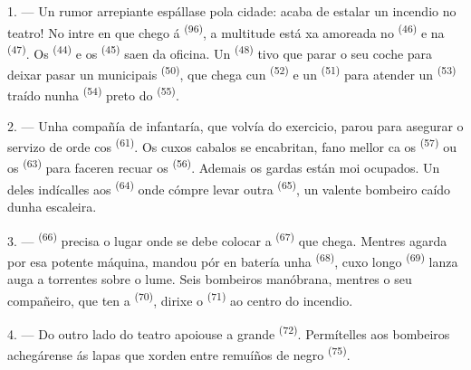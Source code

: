 \VUsaut{5.0mm}
\VUsaut{3.0mm}

\VUsaut{3.4mm}

1. --- Un rumor arrepiante espállase pola cidade: acaba de estalar un incendio no
teatro! No intre en que chego á  \textsuperscript{(96)}, a multitude
está xa amoreada no  \textsuperscript{(46)} e na 
\textsuperscript{(47)}. Os  \textsuperscript{(44)} e os
 \textsuperscript{(45)} saen da oficina. Un  \textsuperscript{(48)} tivo que parar o seu coche para deixar pasar un
 municipais \textsuperscript{(50)}, que chega cun
 \textsuperscript{(52)} e un 
\textsuperscript{(51)} para atender un  \textsuperscript{(53)} traído
nunha  \textsuperscript{(54)} preto do 
\textsuperscript{(55)}.

2. --- Unha compañía de infantaría, que volvía do exercicio, parou para asegurar o
servizo de orde cos  \textsuperscript{(61)}. Os
 cuxos cabalos se encabritan, fano mellor ca os 
\textsuperscript{(57)} ou os  \textsuperscript{(63)} para faceren
recuar os  \textsuperscript{(56)}. Ademais os gardas están moi ocupados. Un
deles
indícalles aos  \textsuperscript{(64)} onde cómpre levar
outra  \textsuperscript{(65)}, un valente bombeiro caído dunha
escaleira.

3. ---  \textsuperscript{(66)} precisa o lugar onde se debe colocar
a  \textsuperscript{(67)} que chega. Mentres agarda por esa
potente máquina, mandou pór en batería unha 
\textsuperscript{(68)}, cuxo longo  \textsuperscript{(69)} lanza auga a
torrentes sobre o lume. Seis bombeiros manóbrana, mentres o seu compañeiro, que ten a
 \textsuperscript{(70)}, dirixe o 
\textsuperscript{(71)} ao centro do incendio.

4. --- Do outro lado do teatro apoiouse a grande 
\textsuperscript{(72)}. Permítelles aos bombeiros achegárense ás lapas que xorden entre
remuíños de  negro \textsuperscript{(75)}.


